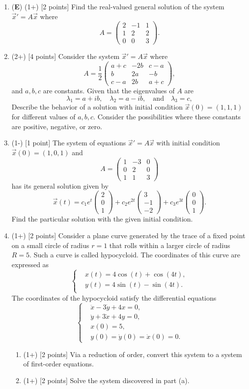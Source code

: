 \documentclass[12pt]{article}
\newcommand{\threebyone}[3]{\begin{pmatrix} %
   #1 \\ #2 \\ #3 \end{pmatrix}}
\newcommand{\threebythree}[9]{\begin{pmatrix} %
   #1 & #2 & #3 \\ #4 & #5 & #6 \\ #7 & #8 & #9 \end{pmatrix}}
\begin{document}
\begin{enumerate}
   \item (\textbf{E}) (1+) [2 points] Find the real-valued general solution of the system \(\vec{x}'=A\vec{x}\) where
         \[
            A=\threebythree{2}{-1}{1}{1}{2}{2}{0}{0}{3}.
         \]

   \item (2+) [4 points] Consider the system \(\vec{x}'=A\vec{x}\) where
         \[
            A=\frac12\threebythree{a+c}{-2b}{c-a}{b}{2a}{-b}{c-a}{2b}{a+c},
         \]
         and \(a,b,c\) are constants. Given that the eigenvalues of \(A\) are
         \[
            \lambda_1=a+ib,\quad\lambda_2=a-ib,\quad\text{and}\quad\lambda_3=c,
         \]
         Describe the behavior of a solution with initial condition \(\vec{x}(0)=(1,1,1)\) for different values of \(a,b,c\). Consider the possibilities where these constants are positive, negative, or zero.

   \item (1-) [1 point] The system of equations \(\vec{x}'=A\vec{x}\) with initial condition \(\vec{x}(0)=(1,0,1)\) and 
         \[
            A=\threebythree{1}{-3}{0}{0}{2}{0}{1}{1}{3}
         \]
         has its general solution given by
         \[
         \vec{x}(t)=c_1e^t\threebyone{2}{0}{1}+c_2e^{2t}\threebyone{3}{-1}{-2}+c_3e^{3t}\threebyone{0}{0}{1}.
         \]
      Find the particular solution with the given initial condition.

   \item (1+) [2 points] Consider a plane curve generated by the trace of a fixed point on a small circle of radius \(r= 1\) that rolls within a larger circle of radius \(R= 5\). Such a curve is called hypocycloid. The coordinates of this curve are expressed as
   \[
   \left\lbrace
   \begin{aligned}
      &x(t)=4\cos(t)+\cos(4t),\\
      &y(t)=4\sin(t)-\sin(4t).\\
   \end{aligned}
   \right.
   \]
   The coordinates of the hypocycloid satisfy the differential equations
   \[
   \left\lbrace
   \begin{aligned}
      &\ddot{x}-3\dot{y}+4x=0,\\
      &\ddot{y}+3\dot{x}+4y=0,\\
      &x(0)=5,\\
      &y(0)=\dot{y}(0)=\dot{x}(0)=0.
   \end{aligned}
   \right.
   \]
    \begin{enumerate}
       \item (1+) [2 points] Via a reduction of order, convert this system to a system of first-order equations.
       \item (1+) [2 points] Solve the system discovered in part (a).
    \end{enumerate}


\end{enumerate}
\end{document}
